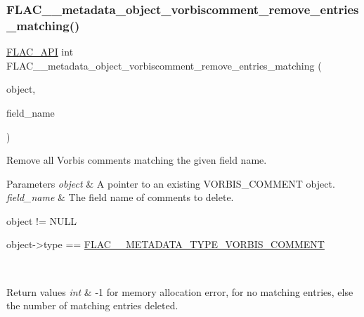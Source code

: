 \subsubsection{\texorpdfstring{F\+L\+A\+C\+\_\+\+\_\+metadata\+\_\+object\+\_\+vorbiscomment\+\_\+remove\+\_\+entries\+\_\+matching()}{FLAC\_\_metadata\_object\_vorbiscomment\_remove\_entries\_matching()}}
{\footnotesize\ttfamily \hyperlink{group__flac__export_ga56ca07df8a23310707732b1c0007d6f5}{F\+L\+A\+C\+\_\+\+A\+PI} int F\+L\+A\+C\+\_\+\+\_\+metadata\+\_\+object\+\_\+vorbiscomment\+\_\+remove\+\_\+entries\+\_\+matching (\begin{DoxyParamCaption}\item[{\hyperlink{struct_f_l_a_c_____stream_metadata}{F\+L\+A\+C\+\_\+\+\_\+\+Stream\+Metadata} $\ast$}]{object,  }\item[{\hyperlink{zconf_8h_a2c212835823e3c54a8ab6d95c652660e}{const} char $\ast$}]{field\+\_\+name }\end{DoxyParamCaption})}

Remove all Vorbis comments matching the given field name.


\begin{DoxyParams}{Parameters}
{\em object} & A pointer to an existing V\+O\+R\+B\+I\+S\+\_\+\+C\+O\+M\+M\+E\+NT object. \\
\hline
{\em field\+\_\+name} & The field name of comments to delete.  
\begin{DoxyCode}
\textcolor{keywordtype}{object} != NULL 
\end{DoxyCode}
 
\begin{DoxyCode}
\textcolor{keywordtype}{object}->type == \hyperlink{group__flac__format_ggac71714ba8ddbbd66d26bb78a427fac01ad013576bc5196b907547739518605520}{FLAC\_\_METADATA\_TYPE\_VORBIS\_COMMENT} 
\end{DoxyCode}
 \\
\hline
\end{DoxyParams}

\begin{DoxyRetVals}{Return values}
{\em int} & {\ttfamily -\/1} for memory allocation error, {} for no matching entries, else the number of matching entries deleted. \\
\hline
\end{DoxyRetVals}
\mbox{\label{group__flac__metadata__object_ga6812052a110800bef2f4139017501507}} 
